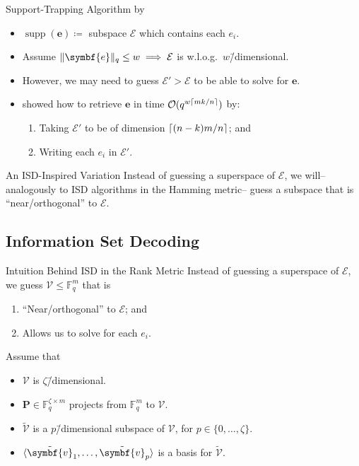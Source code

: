 \documentclass[usepdftitle=false]{beamer}
\renewcommand*{\vec}{\symbf}
\newcommand*{\mat}{\symbf}
\DeclareMathOperator{\supp}{supp}
\DeclarePairedDelimiter{\basis}{\langle}{\rangle}
\newcommand*{\FF}{\ensuremath{\mathbb{F}}}
\newcommand*{\BigOh}{\mathcal{O}}
\DeclarePairedDelimiter{\ceil}{\lceil}{\rceil}
\DeclarePairedDelimiter{\norm}{\lVert}{\rVert}
\newcommand*{\normR}[2]{\ensuremath{\norm{#1}_{#2}}}
\begin{document}
\begin{frame}{Support-Trapping Algorithm by \textcite{GRS13}}
  \begin{itemize}
  \item \(\supp(\vec{e}) \coloneqq\) subspace \(\mathcal{E}\) which
    contains each \(e_i\).
  \item Assume \(\normR{\vec{e}}{q} \le w \implies \mathcal{E}\) is
    w.l.o.g.\ \(w\)\=/dimensional.
  \item However, we may need to guess \(\mathcal{E}' > \mathcal{E}\)
    to be able to solve for \(\vec{e}\).
  \item \Textcite{GRS13} showed how to retrieve \(\vec{e}\) in time
    \(\BigOh(q^{w \ceil{m k / {n}}})\) by:
    \begin{enumerate}
    \item Taking \(\mathcal{E}'\) to be of dimension
      \(\ceil{(n - k) m / {n}}\); and
    \item Writing each \(e_i\) in \(\mathcal{E}'\).
    \end{enumerate}
  \end{itemize}
  \begin{alertblock}{An ISD-Inspired Variation}
    Instead of guessing a superspace of \(\mathcal{E}\), we will\---
    analogously to ISD algorithms in the Hamming metric\--- guess a
    subspace that is \enquote{near\-/orthogonal} to \(\mathcal{E}\).
  \end{alertblock}
\end{frame}

\subsection{Information Set Decoding}

\begin{frame}{Intuition Behind ISD in the Rank Metric}
  Instead of guessing a superspace of \(\mathcal{E}\), we guess
  \(\mathcal{V} \le \FF_q^m\) that is
  \begin{enumerate}
  \item \enquote{Near\-/orthogonal} to \(\mathcal{E}\); and
  \item Allows us to solve for each \(e_i\).
  \end{enumerate}
  Assume that
  \begin{itemize}
  \item \(\mathcal{V}\) is \(\zeta\)\=/dimensional.
  \item \(\mat{P} \in \FF_q^{\zeta \times m}\) projects from
    \(\FF_q^m\) to \(\mathcal{V}\).
  \item \(\tilde{\mathcal{V}}\) is a \(p\)\=/dimensional subspace of
    \(\mathcal{V}\), for \(p \in \{0, \ldots, \zeta\}\).
  \item \(\basis{\tilde{\vec{v}}_1, \ldots, \tilde{\vec{v}}_p}\) is a
    basis for \(\tilde{\mathcal{V}}\).
  \end{itemize}
\end{frame}
\end{document}

